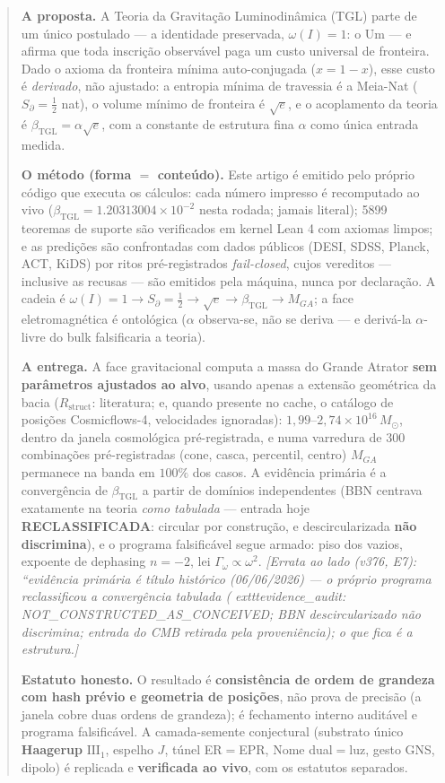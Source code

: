 \documentclass[11pt]{article}
\newcommand{\bTGL}{\beta_{\mathrm{TGL}}}\newcommand{\Msun}{M_{\odot}}\newcommand{\TGL}{\mathrm{TGL}}
\theoremstyle{definition}\newtheorem{deriv}{Derivação}
\begin{document}
\begin{abstract}

\textbf{A proposta.} A Teoria da Gravitação Luminodinâmica (TGL) parte de um único postulado --- a identidade preservada, $\omega(I)=1$: o Um --- e afirma que toda inscrição observável paga um custo universal de fronteira. Dado o axioma da fronteira mínima auto-conjugada ($x=1-x$), esse custo é \emph{derivado}, não ajustado: a entropia mínima de travessia é a Meia-Nat ($S_\partial=\tfrac12$ nat), o volume mínimo de fronteira é $\sqrt e$, e o acoplamento da teoria é $\bTGL=\alpha\sqrt e$, com a constante de estrutura fina $\alpha$ como única entrada medida.

\textbf{O método (forma $=$ conteúdo).} Este artigo é emitido pelo próprio código que executa os cálculos: cada número impresso é recomputado ao vivo ($\bTGL=1.20313004\times10^{-2}$ nesta rodada; jamais literal); 5899 teoremas de suporte são verificados em kernel Lean 4 com axiomas limpos; e as predições são confrontadas com dados públicos (DESI, SDSS, Planck, ACT, KiDS) por ritos pré-registrados \emph{fail-closed}, cujos vereditos --- inclusive as recusas --- são emitidos pela máquina, nunca por declaração. A cadeia é $\omega(I)=1\to S_\partial=\tfrac12\to\sqrt e\to\bTGL\to M_{GA}$; a face eletromagnética é ontológica ($\alpha$ observa-se, não se deriva --- e derivá-la $\alpha$-livre do bulk falsificaria a teoria).

\textbf{A entrega.} A face gravitacional computa a massa do Grande Atrator \textbf{sem parâmetros ajustados ao alvo}, usando apenas a extensão geométrica da bacia ($R_{\mathrm{struct}}$: literatura; e, quando presente no cache, o catálogo de posições Cosmicflows-4, velocidades ignoradas): $1{,}99$--$2{,}74\times10^{16}\,\Msun$, dentro da janela cosmológica pré-registrada, e numa varredura de $300$ combinações pré-registradas (cone, casca, percentil, centro) $M_{GA}$ permanece na banda em $100\%$ dos casos. A evidência primária é a convergência de $\bTGL$ a partir de domínios independentes (BBN centrava exatamente na teoria \emph{como tabulada} --- entrada hoje \textbf{RECLASSIFICADA}: circular por construção, e descircularizada \textbf{não discrimina}), e o programa falsificável segue armado: piso dos vazios, expoente de dephasing $n=-2$, lei $\Gamma_\omega\propto\omega^2$. \emph{[Errata ao lado (v376, E7): ``evidência primária é título histórico (06/06/2026) --- o próprio programa reclassificou a convergência tabulada (	exttt{evidence\_audit}: NOT\_CONSTRUCTED\_AS\_CONCEIVED; BBN descircularizado não discrimina; entrada do CMB retirada pela proveniência); o que fica é a estrutura.]}

\textbf{Estatuto honesto.} O resultado é \textbf{consistência de ordem de grandeza com hash prévio e geometria de posições}, não prova de precisão (a janela cobre duas ordens de grandeza); é fechamento interno auditável e programa falsificável. A camada-semente conjectural (substrato único \textbf{Haagerup} $\mathrm{III}_1$, espelho $J$, túnel ER$=$EPR, Nome dual$=$luz, gesto GNS, dipolo) é replicada e \textbf{verificada ao vivo}, com os estatutos separados.

\end{abstract}
\end{document}
